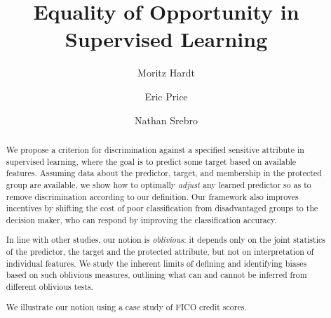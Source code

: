 \documentclass[11pt]{article}
\title{Equality of Opportunity in Supervised Learning}
\author{Moritz Hardt\and Eric Price\and Nathan Srebro}
\theoremstyle{definition}
\numberwithin{equation}{section}
\begin{document}
\maketitle

\begin{abstract}
  We propose a criterion for discrimination against a specified
  sensitive attribute in supervised learning, where the goal is to
  predict some target based on available features. Assuming data about
  the predictor, target, and membership in the protected group are
  available, we show how to optimally \emph{adjust} any learned
  predictor so as to remove discrimination according to our
  definition. Our framework also improves incentives by shifting the
  cost of poor classification from disadvantaged groups to the
  decision maker, who can respond by improving the classification
  accuracy.

  In line with other studies, our notion is \emph{oblivious}: it
  depends only on the joint statistics of the predictor, the target
  and the protected attribute, but not on interpretation of individual
  features. We study the inherent limits of defining and identifying
  biases based on such oblivious measures, outlining what can and
  cannot be inferred from different oblivious tests.

  We illustrate our notion using a case study of FICO credit scores.
\end{abstract}








%
%
\end{document}
